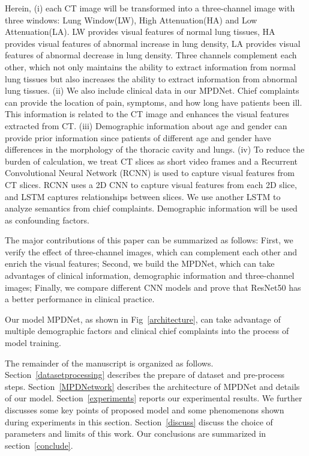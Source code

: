 \documentclass[journal]{IEEEtran}
\begin{document}
Herein, (i) each CT image will be transformed into a three-channel image with three windows: Lung Window(LW), High Attenuation(HA) and Low Attenuation(LA). LW provides visual features of normal lung tissues, HA provides visual features of abnormal increase in lung density, LA provides visual features of abnormal decrease in lung density. Three channels complement each other, which not only maintains the ability to extract information from normal lung tissues but also increases the ability to extract information from abnormal lung tissues.
(ii) We also include clinical data in our MPDNet. Chief complaints can provide the location of pain, symptoms, and how long have patients been ill. This information is related to the CT image and enhances the visual features extracted from CT. 
(iii) Demographic information about age and gender can provide prior information since patients of different age and gender have differences in the morphology of the thoracic cavity and lungs. 
(iv) To reduce the burden of calculation, we treat CT slices as short video frames and a Recurrent Convolutional Neural Network (RCNN) is used to capture visual features from CT slices. RCNN uses a 2D CNN to capture visual features from each 2D slice, and LSTM captures relationships between slices. We use another LSTM to analyze semantics from chief complaints. Demographic information will be used as confounding factors. 

The major contributions of this paper can be summarized as follows:
First, we verify the effect of three-channel images, which can complement each other and enrich the visual features; Second, we build the MPDNet, which can take advantages of clinical information, demographic information and three-channel images; Finally, we compare different CNN models and prove that ResNet50 has a better performance in clinical practice.

Our model MPDNet, as shown in Fig~\ref{architecture}, can take advantage of multiple demographic factors and clinical chief complaints into the process of model training.

The remainder of the manuscript is organized as follows. 
Section~\ref{datasetprocessing} describes the prepare of dataset and pre-process steps.
Section~\ref{MPDNetwork} describes the architecture of MPDNet and details of our model.
Section~\ref{experiments} reports our experimental results. We further discusses some key points of proposed model and some phenomenons shown during experiments in this section.
Section~\ref{discuss} discuss the choice of parameters and limits of this work.
Our conclusions are summarized in section~\ref{conclude}.
\end{document}
